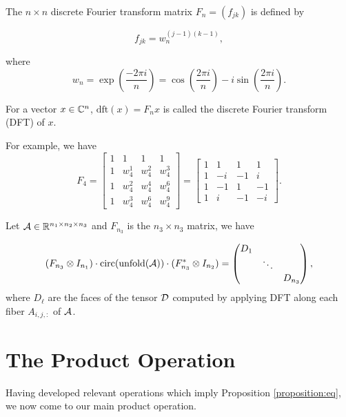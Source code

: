 The $n\times n$ discrete Fourier transform matrix $F_n = (f_{jk})$ is defined \cite{golub2013matrix} by

\begin{equation}
    f_{jk} = w_n^{(j-1)(k-1)},
\end{equation}

where
$$ w_n = \exp\left(\dfrac{-2\pi i}{n}\right) = \cos\left(\dfrac{2\pi i}{n}\right) - i\sin\left(\dfrac{2\pi i}{n}\right).$$

For a vector $x\in{\mathbb{C}}^n$, $\mathrm{dft}(x) = F_nx$ is called the discrete Fourier transform (DFT) of $x$.

For example, we have
$$F_4 = \begin{bmatrix}
        1 & 1     & 1     & 1     \\
        1 & w_4^1 & w_4^2 & w_4^3 \\
        1 & w_4^2 & w_4^4 & w_4^6 \\
        1 & w_4^3 & w_4^6 & w_4^9
    \end{bmatrix} = \begin{bmatrix}
        1 & 1  & 1  & 1  \\
        1 & -i & -1 & i  \\
        1 & -1 & 1  & -1 \\
        1 & i  & -1 & -i
    \end{bmatrix}.$$


\begin{proposition}
    \label{proposition:eq}
    Let $\mathcal{A}\in{\mathbb{R}}^{n_1\times n_2\times n_3}$ and $F_{n_3}$ is the $n_3\times n_3$ matrix, we have

    \begin{equation}
        (F_{n_3}\otimes I_{n_1}) \cdot \mathrm{circ}(\mathrm{unfold}(\mathcal{A})) \cdot (F_{n_3}^*\otimes I_{n_2}) =     \begin{pmatrix}
            D_1 &        &         \\
                & \ddots &         \\
                &        & D_{n_3} \\
        \end{pmatrix},
    \end{equation}
    where $D_\ell$ are the faces of the tensor $\mathcal{D}$ computed by applying DFT along each fiber $A_{i,j,:}$ of $\mathcal{A}$.
\end{proposition}

\section{The Product Operation}
Having developed relevant operations which imply Proposition \ref{proposition:eq}, we now come to our main product operation.

